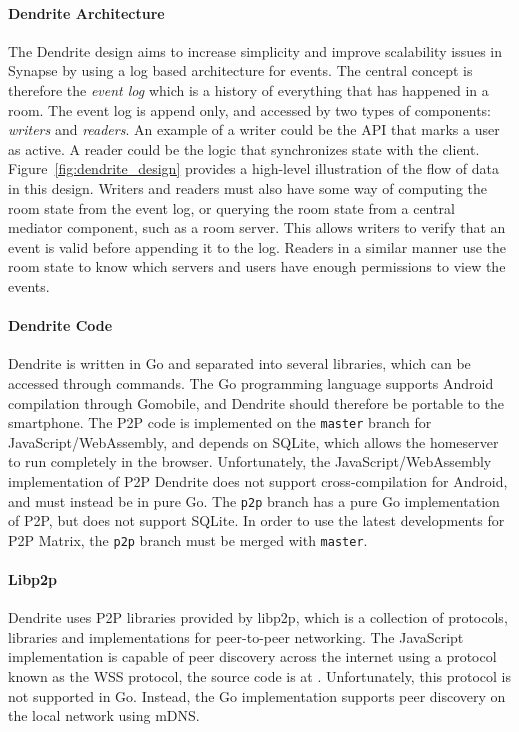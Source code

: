 \paragraph{Dendrite Architecture}
The Dendrite design aims to increase simplicity and improve scalability issues in Synapse by using a log based architecture for events.
The central concept is therefore the \textit{event log} which is a history of everything that has happened in a room.
The event log is append only, and accessed by two types of components: \textit{writers} and \textit{readers}.
An example of a writer could be the API that marks a user as active.
A reader could be the logic that synchronizes state with the client.
Figure~\ref{fig:dendrite_design} provides a high-level illustration of the flow of data in this design.
Writers and readers must also have some way of computing the room state from the event log, or querying the room state from a central mediator component, such as a room server.
This allows writers to verify that an event is valid before appending it to the log.
Readers in a similar manner use the room state to know which servers and users have enough permissions to view the events.

\paragraph{Dendrite Code}
Dendrite is written in Go\cite{golang_org} and separated into several libraries, which can be accessed through commands.
The Go programming language supports Android compilation through Gomobile\cite{gomobile}, and Dendrite should therefore be portable to the smartphone.
The \ac{P2P} code is implemented on the \texttt{master} branch for JavaScript/WebAssembly, and depends on SQLite, which allows the homeserver to run completely in the browser.
Unfortunately, the JavaScript/WebAssembly implementation of \ac{P2P} Dendrite does not support cross-compilation for Android, and must instead be in pure Go.
The \texttt{p2p} branch has a pure Go implementation of \ac{P2P}, but does not support SQLite.
In order to use the latest developments for \ac{P2P} Matrix, the \texttt{p2p} branch must be merged with \texttt{master}.

\paragraph{Libp2p}
Dendrite uses \ac{P2P} libraries provided by libp2p, which is a collection of protocols, libraries and implementations for peer-to-peer networking\cite{libp2p}.
The JavaScript implementation is capable of peer discovery across the internet using a protocol known as the \ac{WSS} protocol, the source code is at .
Unfortunately, this protocol is not supported in Go\cite{libp2p_implementations}.
Instead, the Go implementation supports peer discovery on the local network using \ac{mDNS}.

